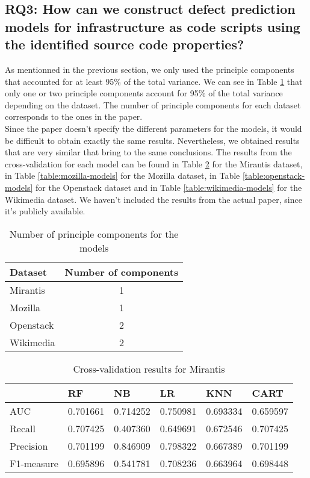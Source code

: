 \subsection{RQ3: How can we construct defect prediction models for 
infrastructure as code scripts using the identified source code properties?}
As mentionned in the previous section, we only used the principle components 
that accounted for at least 95\% of the total variance. We can see in Table
\ref{table:pca} that only one or two principle components account for 95\% of 
the total variance depending on the dataset. The number of principle components
for each dataset corresponds to the ones in the paper.\\

Since the paper doesn't specify the different parameters for the models, 
it would be difficult to obtain exactly the same results. Nevertheless, we 
obtained results that are very similar that bring to the same conclusions.
The results from the cross-validation for each model can be found in Table 
\ref{table:mirantis-models} for the Mirantis dataset, in Table \ref{table:mozilla-models}
for the Mozilla dataset, in Table \ref{table:openstack-models} for the Openstack
dataset and in Table \ref{table:wikimedia-models} for the Wikimedia dataset. 
We haven't included the results from the actual paper, since it's publicly 
available.


\begin{table}[h]
  \caption{Number of principle components for the models}
  \label{table:pca}
    \centering
    \begin{tabular}{|l|c|}
    \hline
        Dataset   & Number of components \\ \hline
        Mirantis  & 1 \\ \hline
        Mozilla   & 1 \\ \hline
        Openstack & 2 \\ \hline
        Wikimedia & 2 \\ \hline
    \end{tabular}
\end{table}




\begin{table}[h]
  \caption{Cross-validation results for Mirantis}
  \label{table:mirantis-models}
    \centering
    \begin{tabular}{|l|l|l|l|l|l|}
    \hline
        ~ & RF & NB & LR & KNN & CART \\ \hline
        AUC & 0.701661 & 0.714252 & 0.750981 & 0.693334 & 0.659597 \\ \hline
        Recall & 0.707425 & 0.407360 & 0.649691 & 0.672546 & 0.707425 \\ \hline
        Precision & 0.701199 & 0.846909 & 0.798322 & 0.667389 & 0.701199 \\ \hline
        F1-measure  & 0.695896 & 0.541781 & 0.708236 & 0.663964 & 0.698448 \\ \hline
    \end{tabular}
\end{table}

